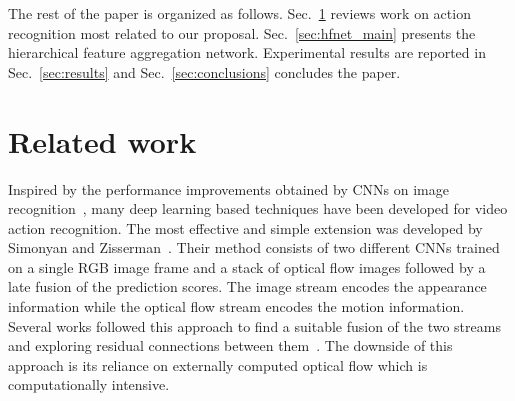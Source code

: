 \documentclass[journal,onecolumn]{IEEEtran}
\begin{document}
The rest of the paper is organized as follows. Sec.~\ref{sec:related_works} reviews work on action recognition most related to our proposal. Sec.~\ref{sec:hfnet_main} presents the hierarchical feature aggregation network. Experimental results are reported in Sec.~\ref{sec:results} and Sec.~\ref{sec:conclusions} concludes the paper.












\section{Related work}

\label{sec:related_works}

Inspired by the performance improvements obtained by CNNs on image recognition~\cite{resnet, szegedy2016rethinking}, many deep learning based techniques have been developed for video action recognition. The most effective and simple extension was developed by Simonyan and Zisserman~\cite{twoStream}. Their method consists of two different CNNs trained on a single RGB image frame and a stack of optical flow images followed by a late fusion of the prediction scores. The image stream encodes the appearance information while the optical flow stream encodes the motion information. Several works followed this approach to find a suitable fusion of the two streams~\cite{feichtenhofer2016convolutional} and exploring residual connections between them~\cite{feichtenhofer2016spatiotemporal}. The downside of this approach is its reliance on externally computed optical flow which is computationally intensive.
\end{document}
